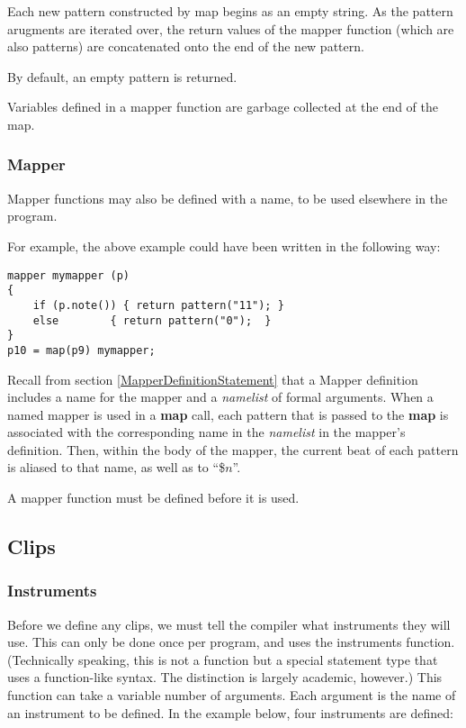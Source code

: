 Each new pattern constructed by map begins as an empty string.  As the pattern arugments are iterated over, the return values of the mapper function (which are also patterns) are concatenated onto the end of the new pattern.

By default, an empty pattern is returned.

Variables defined in a mapper function are garbage collected at the end of the map.

\subsubsection{Mapper}

Mapper functions may also be defined with a name, to be used elsewhere in the program.

For example, the above example could have been written in the following way:
\begin{verbatim}
mapper mymapper (p)
{
    if (p.note()) { return pattern("11"); }
    else        { return pattern("0");  }
}
p10 = map(p9) mymapper;
\end{verbatim}

Recall from section \ref{MapperDefinitionStatement} that a  Mapper definition includes a name for the mapper and  a \emph{namelist} of formal arguments.
When a named mapper is used in a \textbf{map} call, each pattern that is passed to the \textbf{map} is associated with the corresponding name in the \emph{namelist} in the mapper's definition.
Then, within the body of the mapper, the current beat of each pattern is aliased to that name, as well as to ``\$$n$''.

A mapper function must be defined before it is used.





\subsection{Clips}

\subsubsection{Instruments}\label{instrSection}

Before we define any clips, we must tell the compiler what instruments they will use.
This can only be done once per program, and uses the instruments function.
(Technically speaking, this is not a function but a special statement type that uses a function-like syntax.  The distinction is largely academic, however.)
This function can take a variable number of arguments.  Each argument is the name of an instrument to be defined.  In the example below, four instruments are defined:

